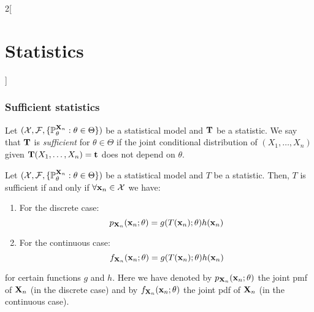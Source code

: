 \documentclass[../../../main_math.tex]{subfiles}
\begin{document}
\begin{multicols}{2}[\section{Statistics}]
  \subsubsection{Sufficient statistics}
  \begin{definition}
    Let $(\mathcal{X},\mathcal{F},\{\mathbb{P}_\theta^{\boldsymbol{\mathrm{X}}_n}:\theta\in\Theta\})$ be a statistical model and $\boldsymbol{\mathrm{T}}$ be a statistic. We say that $\boldsymbol{\mathrm{T}}$ is \emph{sufficient} for $\theta\in\Theta$ if the joint conditional distribution of $(X_1,\ldots,X_n)$ given $\boldsymbol{\mathrm{T}}(X_1,\ldots,X_n)=\boldsymbol{\mathrm{t}}$ does not depend on $\theta$.
  \end{definition}
  \begin{theorem}
    Let $(\mathcal{X},\mathcal{F},\{\mathbb{P}_\theta^{\boldsymbol{\mathrm{X}}_n}:\theta\in\Theta\})$ be a statistical model and $T$ be a statistic. Then, $T$ is sufficient if and only if $\forall \boldsymbol{\mathrm{x}}_n\in\mathcal{X}$ we have:
    \begin{enumerate}
      \item For the discrete case: $$p_{\boldsymbol{\mathrm{X}}_n}(\boldsymbol{\mathrm{x}}_n;\theta)=g(T(\boldsymbol{\mathrm{x}}_n);\theta)h(\boldsymbol{\mathrm{x}}_n)$$
      \item For the continuous case:  $$f_{\boldsymbol{\mathrm{X}}_n}(\boldsymbol{\mathrm{x}}_n;\theta)=g(T(\boldsymbol{\mathrm{x}}_n);\theta)h(\boldsymbol{\mathrm{x}}_n)$$
    \end{enumerate}
    for certain functions $g$ and $h$. Here we have denoted by $p_{\boldsymbol{\mathrm{X}}_n}(\boldsymbol{\mathrm{x}}_n;\theta)$ the joint pmf of $\boldsymbol{\mathrm{X}}_n$ (in the discrete case) and by $f_{\boldsymbol{\mathrm{X}}_n}(\boldsymbol{\mathrm{x}}_n;\theta)$ the joint pdf of $\boldsymbol{\mathrm{X}}_n$ (in the continuous case).
  \end{theorem}

\end{multicols}
\end{document}
